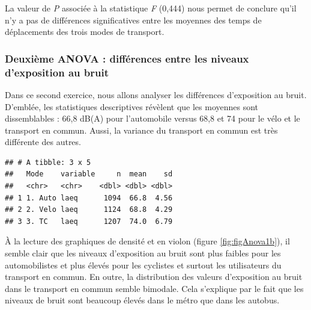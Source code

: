 \documentclass[
  11pt,
  french,
]{book}
\makeatletter
\newenvironment{Shaded}{\begin{snugshade}}{\end{snugshade}}
\newcommand{\CommentTok}[1]{\textcolor[rgb]{0.56,0.35,0.01}{\textit{#1}}}
\newcommand{\DataTypeTok}[1]{\textcolor[rgb]{0.13,0.29,0.53}{#1}}
\newcommand{\KeywordTok}[1]{\textcolor[rgb]{0.13,0.29,0.53}{\textbf{#1}}}
\newcommand{\NormalTok}[1]{#1}
\newcommand{\OperatorTok}[1]{\textcolor[rgb]{0.81,0.36,0.00}{\textbf{#1}}}
\newcommand{\StringTok}[1]{\textcolor[rgb]{0.31,0.60,0.02}{#1}}
\newenvironment{kframe}{%
\medskip{}
\setlength{\fboxsep}{.8em}
 \def\at@end@of@kframe{}%
 \ifinner\ifhmode%
  \def\at@end@of@kframe{\end{minipage}}%
  \begin{minipage}{\columnwidth}%
 \fi\fi%
 \def\FrameCommand##1{\hskip\@totalleftmargin \hskip-\fboxsep
 \colorbox{shadecolor}{##1}\hskip-\fboxsep
     \hskip-\linewidth \hskip-\@totalleftmargin \hskip\columnwidth}%
 \MakeFramed {\advance\hsize-\width
   \@totalleftmargin\z@ \linewidth\hsize
   \@setminipage}}%
 {\par\unskip\endMakeFramed%
 \at@end@of@kframe}
\renewenvironment{Shaded}{\begin{kframe}}{\end{kframe}}
\makeatother
\begin{document}
La valeur de \emph{P} associée à la statistique \emph{F} (0,444) nous permet de conclure qu'il n'y a pas de différences significatives entre les moyennes des temps de déplacements des trois modes de transport.

\hypertarget{deuxiuxe8me-anova-diffuxe9rences-entre-les-niveaux-dexposition-au-bruit}{%
\subsubsection{Deuxième ANOVA : différences entre les niveaux d'exposition au bruit}\label{deuxiuxe8me-anova-diffuxe9rences-entre-les-niveaux-dexposition-au-bruit}}

Dans ce second exercice, nous allons analyser les différences d'exposition au bruit. D'emblée, les statistiques descriptives révèlent que les moyennes sont dissemblables : 66,8 dB(A) pour l'automobile versus 68,8 et 74 pour le vélo et le transport en commun. Aussi, la variance du transport en commun est très différente des autres.

\begin{Shaded}
\end{Shaded}

\begin{verbatim}
## # A tibble: 3 x 5
##   Mode    variable     n  mean    sd
##   <chr>   <chr>    <dbl> <dbl> <dbl>
## 1 1. Auto laeq      1094  66.8  4.56
## 2 2. Velo laeq      1124  68.8  4.29
## 3 3. TC   laeq      1207  74.0  6.79
\end{verbatim}

À la lecture des graphiques de densité et en violon (figure \ref{fig:figAnova1b}), il semble clair que les niveaux d'exposition au bruit sont plus faibles pour les automobilistes et plus élevés pour les cyclistes et surtout les utilisateurs du transport en commun. En outre, la distribution des valeurs d'exposition au bruit dans le transport en commun semble bimodale. Cela s'explique par le fait que les niveaux de bruit sont beaucoup élevés dans le métro que dans les autobus.
\end{document}
